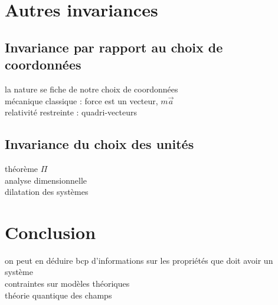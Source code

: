 \section{Autres invariances}
\subsection{Invariance par rapport au choix de coordonnées}
la nature se fiche de notre choix de coordonnées \\
mécanique classique : force est un vecteur, $m\vec{a}$ \\
relativité restreinte : quadri-vecteurs \\

\subsection{Invariance du choix des unités}
 théorème $\Pi$ \\
 analyse dimensionnelle \\

dilatation des systèmes \\


\section*{Conclusion}
on peut en déduire bcp d'informations sur les propriétés que doit avoir un système \\
contraintes sur modèles théoriques \\
théorie quantique des champs \\


